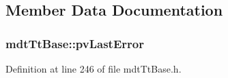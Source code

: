 \subsection{Member Data Documentation}
\hypertarget{classmdt_tt_base_aaa2bcddcfcecd1642ac24a218bccfbc7}{
\subsubsection[{pv\-Last\-Error}]{ mdt\-Tt\-Base\-::pv\-Last\-Error\hspace{0.3cm}{\ttfamily [protected]}}}\label{classmdt_tt_base_aaa2bcddcfcecd1642ac24a218bccfbc7}


Definition at line 246 of file mdt\-Tt\-Base.\-h.



